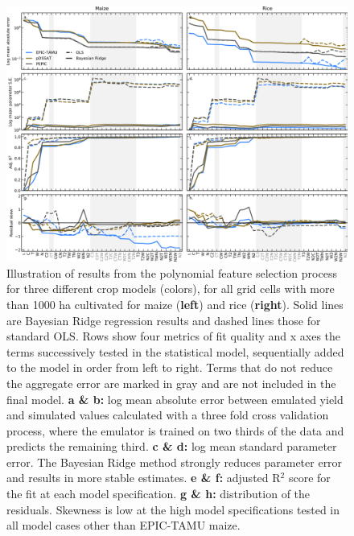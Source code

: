 \documentclass[gmdd]{copernicus} %
\begin{document}
\begin{figure}[ht]
\centering
   \includegraphics[width=15cm]{figures/model_select_maize_rice.png}
    \caption{
    Illustration of results from the polynomial feature selection process for three different crop models (colors), for all grid cells with more than 1000 ha cultivated for maize (\textbf{left}) and rice (\textbf{right}). 
    Solid lines are Bayesian Ridge regression results and dashed lines those for standard OLS. Rows show four metrics of fit quality and x axes the terms successively tested in the statistical model, sequentially added to the model in order from left to right.
    Terms that do not reduce the aggregate error are marked in {\color{dark-gray} gray} and are not included in the final model. 
    \textbf{a \& b:} log mean absolute error between emulated yield and simulated values calculated with a three fold cross validation process, where the emulator is trained on two thirds of the data and predicts the remaining third.
    \textbf{c \& d:} log mean standard parameter error. The Bayesian Ridge method strongly reduces parameter error and results in more stable estimates. 
    \textbf{e \& f:} adjusted R$^2$ score for the fit at each model specification. 
    \textbf{g \& h:} distribution of the residuals. Skewness is low at the high model specifications tested in all model cases other than EPIC-TAMU maize.
    }
   \label{fig:features}
\end{figure}
\end{document}
